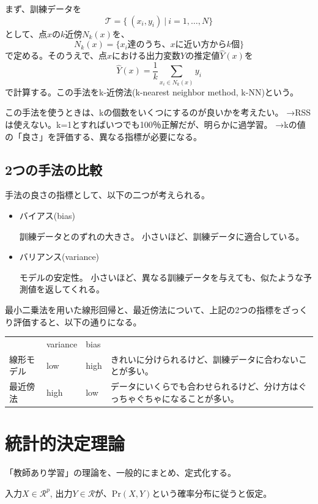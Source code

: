 \documentclass[uplatex]{jsarticle}
\begin{document}
まず、訓練データを
\[
  \mathcal{T}=\{ \ (x_i,y_i) \ | \ i=1,\dots,N\}
\]
として、点$x$の$k$近傍$N_k(x)$を、
\[
  N_k(x)=\{x_i\mbox{達のうち、}x\mbox{に近い方から}k\mbox{個}\}
\]
で定める。そのうえで、点$x$における出力変数$Y$の推定値$\hat{Y}(x)$を
\[
  \hat{Y}(x)=\frac{1}{k}\sum_{x_i \in N_k(x)}y_i
\]
で計算する。この手法をk-近傍法(k-nearest neighbor method, k-NN)という。

この手法を使うときは、kの個数をいくつにするのが良いかを考えたい。
→RSSは使えない。k=1とすればいつでも100％正解だが、明らかに過学習。
→kの値の「良さ」を評価する、異なる指標が必要になる。

\subsection{2つの手法の比較}
手法の良さの指標として、以下の二つが考えられる。
\begin{itemize}
  \item バイアス(bias)

  訓練データとのずれの大きさ。
  小さいほど、訓練データに適合している。

  \item バリアンス(variance)

  モデルの安定性。
  小さいほど、異なる訓練データを与えても、似たような予測値を返してくれる。
\end{itemize}

最小二乗法を用いた線形回帰と、最近傍法について、上記の2つの指標をざっくり評価すると、以下の通りになる。

\begin{table}[htb]
  \begin{tabular}{lllp{20em}}
    \ & variance & bias & \ \\
    線形モデル & low & high & きれいに分けられるけど、訓練データに合わないことが多い。\\
    最近傍法 & high & low & データにいくらでも合わせられるけど、分け方はぐっちゃぐちゃになることが多い。
  \end{tabular}
\end{table}


\section{統計的決定理論}

「教師あり学習」の理論を、一般的にまとめ、定式化する。

入力$X \in \mathcal{R}^p$, 出力$Y \in \mathcal{R}$が、$\mathrm{Pr}(X, Y)$という確率分布に従うと仮定。
\end{document}
